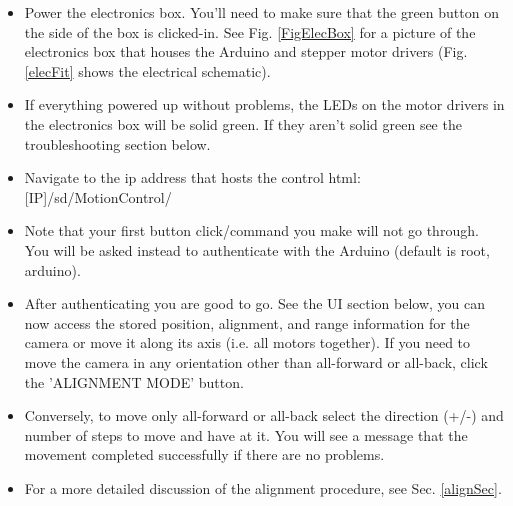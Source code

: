 \documentclass[11pt]{article}
\begin{document}
\begin{itemize}
	\item Power the electronics box.  You'll need to make sure that the green button on the side of the box is clicked-in.
		See Fig. \ref{FigElecBox} for a picture of the electronics box that houses the Arduino and stepper motor drivers (Fig. \ref{elecFit} shows the electrical schematic).  
	\item If everything powered up without problems, the LEDs on the motor drivers in the electronics box will be solid green. 
		If they aren't solid green see the troubleshooting section below.
	\item Navigate to the ip address that hosts the control html: [IP]/sd/MotionControl/
	\item Note that your first button click/command you make will not go through.  
		You will be asked instead to authenticate with the Arduino (default is root, arduino).
	\item After authenticating you are good to go.  
		See the UI section below, you can now access the stored position, alignment, and range information for the camera or move it along its axis (i.e. all motors together).  
		If you need to move the camera in any orientation other than all-forward or all-back, click the 'ALIGNMENT MODE' button. 
	\item Conversely, to move only all-forward or all-back select the direction (+/-) and number of steps to move and have at it.  
		You will see a message that the movement completed successfully if there are no problems.
	\item For a more detailed discussion of the alignment procedure, see Sec. \ref{alignSec}.
\end{itemize}
\end{document}
